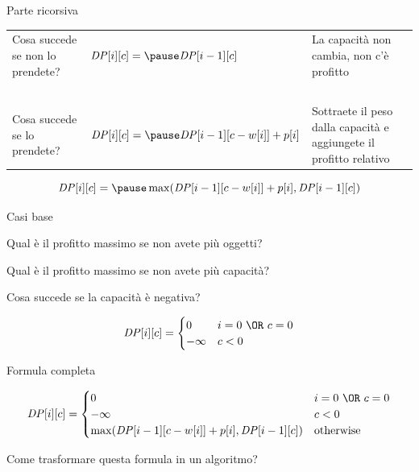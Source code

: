 \begin{frame}{Parte ricorsiva}

\vspace{-9pt}

\bigskip
\begingroup
\renewcommand*{\arraystretch}{1.2}
\begin{tabular}{P{2.8cm}P{3.9cm}P{4.0cm}}
Cosa succede se non lo prendete? & $\mathit{DP}[i][c] = \pause\newline \mathit{DP}[i-1][c]$ & La capacità non cambia, non c'è profitto \\
~\\
Cosa succede se lo prendete? & $\mathit{DP}[i][c] = \pause \mathit{DP}[i-1][c-w[i]] + p[i]$ & Sottraete il peso dalla capacità e aggiungete il profitto relativo \\
\end{tabular}
\endgroup


\[
\mathit{DP}[i][c] = \pause \max( \mathit{DP}[i-1][c-w[i]] + p[i], \mathit{DP}[i-1][c] )
\]

\end{frame}


\begin{frame}{Casi base}

\vspace{-9pt}

\pause
\BIL
\item Qual è il profitto massimo se non avete più oggetti?
\item Qual è il profitto massimo se non avete più capacità?
\item Cosa succede se la capacità è negativa?
\EIL

\pause
\[
\mathit{DP}[i][c] = \begin{cases}
  0 & i=0\ \OR\ c=0 \\
  -\infty & c < 0
\end{cases}
\]

\end{frame}

\begin{frame}{Formula completa}

\begingroup
\small
\[
\mathit{DP}[i][c] = \begin{cases}
  0 & i=0\ \OR\ c=0 \\
  -\infty & c < 0 \\
  \max( \mathit{DP}[i-1][c-w[i]] + p[i], \mathit{DP}[i-1][c] ) & \textrm{otherwise}
\end{cases}
\]
\endgroup

Come trasformare questa formula in un algoritmo?

\end{frame}

